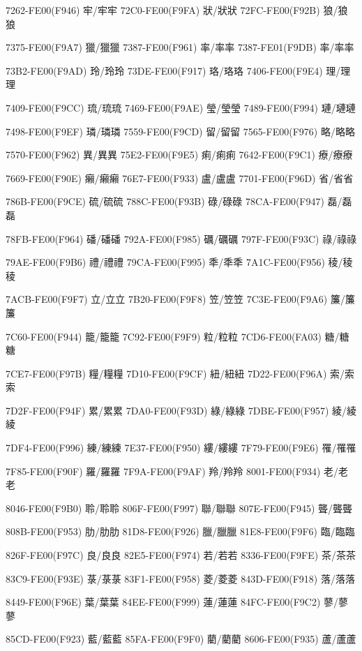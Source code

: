 7262-FE00(F946) 牢/牢︀牢 
72C0-FE00(F9FA) 狀/狀︀狀 
72FC-FE00(F92B) 狼/狼︀狼\par
7375-FE00(F9A7) 獵/獵︀獵 
7387-FE00(F961) 率/率︀率 
7387-FE01(F9DB) 率/率︁率\par
73B2-FE00(F9AD) 玲/玲︀玲 
73DE-FE00(F917) 珞/珞︀珞 
7406-FE00(F9E4) 理/理︀理\par
7409-FE00(F9CC) 琉/琉︀琉 
7469-FE00(F9AE) 瑩/瑩︀瑩 
7489-FE00(F994) 璉/璉︀璉\par
7498-FE00(F9EF) 璘/璘︀璘 
7559-FE00(F9CD) 留/留︀留 
7565-FE00(F976) 略/略︀略\par
7570-FE00(F962) 異/異︀異 
75E2-FE00(F9E5) 痢/痢︀痢 
7642-FE00(F9C1) 療/療︀療\par
7669-FE00(F90E) 癩/癩︀癩 
76E7-FE00(F933) 盧/盧︀盧 
7701-FE00(F96D) 省/省︀省\par
786B-FE00(F9CE) 硫/硫︀硫 
788C-FE00(F93B) 碌/碌︀碌 
78CA-FE00(F947) 磊/磊︀磊\par
78FB-FE00(F964) 磻/磻︀磻 
792A-FE00(F985) 礪/礪︀礪 
797F-FE00(F93C) 祿/祿︀祿\par
79AE-FE00(F9B6) 禮/禮︀禮 
79CA-FE00(F995) 秊/秊︀秊 
7A1C-FE00(F956) 稜/稜︀稜\par
7ACB-FE00(F9F7) 立/立︀立 
7B20-FE00(F9F8) 笠/笠︀笠 
7C3E-FE00(F9A6) 簾/簾︀簾\par
7C60-FE00(F944) 籠/籠︀籠 
7C92-FE00(F9F9) 粒/粒︀粒 
7CD6-FE00(FA03) 糖/糖︀糖\par
7CE7-FE00(F97B) 糧/糧︀糧 
7D10-FE00(F9CF) 紐/紐︀紐 
7D22-FE00(F96A) 索/索︀索\par
7D2F-FE00(F94F) 累/累︀累 
7DA0-FE00(F93D) 綠/綠︀綠 
7DBE-FE00(F957) 綾/綾︀綾\par
7DF4-FE00(F996) 練/練︀練 
7E37-FE00(F950) 縷/縷︀縷 
7F79-FE00(F9E6) 罹/罹︀罹\par
7F85-FE00(F90F) 羅/羅︀羅 
7F9A-FE00(F9AF) 羚/羚︀羚 
8001-FE00(F934) 老/老︀老\par
8046-FE00(F9B0) 聆/聆︀聆 
806F-FE00(F997) 聯/聯︀聯 
807E-FE00(F945) 聾/聾︀聾\par
808B-FE00(F953) 肋/肋︀肋 
81D8-FE00(F926) 臘/臘︀臘 
81E8-FE00(F9F6) 臨/臨︀臨\par
826F-FE00(F97C) 良/良︀良 
82E5-FE00(F974) 若/若︀若 
8336-FE00(F9FE) 茶/茶︀茶\par
83C9-FE00(F93E) 菉/菉︀菉 
83F1-FE00(F958) 菱/菱︀菱 
843D-FE00(F918) 落/落︀落\par
8449-FE00(F96E) 葉/葉︀葉 
84EE-FE00(F999) 蓮/蓮︀蓮 
84FC-FE00(F9C2) 蓼/蓼︀蓼\par
85CD-FE00(F923) 藍/藍︀藍 
85FA-FE00(F9F0) 藺/藺︀藺 
8606-FE00(F935) 蘆/蘆︀蘆\par
